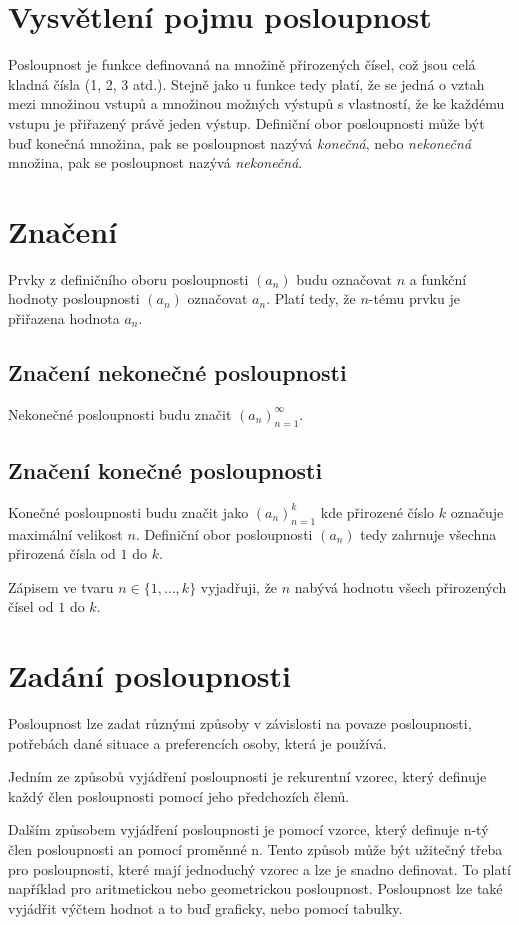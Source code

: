 \documentclass[12pt]{report}			%
\begin{document}
		\section{Vysvětlení pojmu posloupnost}
Posloupnost je funkce definovaná na množině přirozených čísel, což jsou celá kladná čísla (1, 2, 3 atd.). Stejně jako u funkce tedy platí, že se jedná o vztah mezi množinou vstupů a množinou možných výstupů s vlastností, že ke každému vstupu je přiřazený právě jeden výstup. Definiční obor posloupnosti může být buď konečná množina, pak se posloupnost nazývá \emph{konečná}, nebo \emph{nekonečná} množina, pak se posloupnost nazývá \emph{nekonečná}.
		\section{Značení}
Prvky z definičního oboru posloupnosti $(a_n)$ budu označovat $n$ a funkční hodnoty posloupnosti $(a_n)$ označovat $a_n$. Platí tedy, že $n$-tému prvku je přiřazena hodnota $a_n$.
		\subsection{Značení nekonečné posloupnosti}
Nekonečné posloupnosti budu značit $(a_n)_{n=1}^{\infty} $.
		\subsection{Značení konečné posloupnosti}
Konečné posloupnosti budu značit jako $(a_n)_{n=1}^k$ kde přirozené číslo $k$ označuje maximální velikost $n$. Definiční obor posloupnosti $(a_n)$ tedy zahrnuje všechna přirozená čísla od $1$ do $k$. 

Zápisem ve tvaru $n \in \{1, \dots, k\}$ vyjadřuji, že $n$ nabývá hodnotu všech přirozených čísel od $1$ do $k$.

\section{Zadání posloupnosti}
Posloupnost lze zadat různými způsoby v závislosti na povaze posloupnosti, potřebách dané situace a preferencích osoby, která je používá.

Jedním ze způsobů vyjádření posloupnosti je rekurentní vzorec, který definuje každý člen posloupnosti pomocí jeho předchozích členů. 

Dalším způsobem vyjádření posloupnosti je pomocí vzorce, který definuje n-tý člen posloupnosti an pomocí proměnné n. Tento způsob může být užitečný třeba pro posloupnosti, které mají jednoduchý vzorec a lze je snadno definovat. To platí například pro aritmetickou nebo geometrickou posloupnost. 
Posloupnost lze také vyjádřit výčtem hodnot a to buď graficky, nebo pomocí tabulky.  
\end{document}
